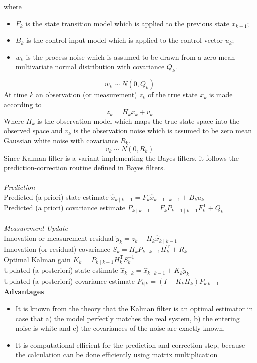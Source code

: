 where
\begin{itemize}
  \item $F_k$ is the state transition model which is applied to the previous state $x_{k-1}$;  
  \item $B_k$ is the control-input model which is applied to the control vector $u_k$;
  \item $w_k$ is the process noise which is assumed to be drawn from a zero mean multivariate normal distribution with covariance $Q_k$.
\end{itemize}
$$w_k \sim N(0,Q_k)$$
At time $k$ an observation (or measurement) $z_k$ of the true state $x_k$ is made according to
$$z_k = H_kx_k + v_k$$
Where $H_k$ is the observation model which maps the true state space into the observed space and $v_k$ is the observation noise which is assumed to be zero mean Gaussian white noise with covariance $R_k$.
$$v_k \sim N(0,R_k)$$
Since Kalman filter is a variant implementing the Bayes filters, it follows the prediction-correction routine defined in Bayes filters.
\\
\\
\noindent\textit{Prediction}\\
Predicted (a priori) state estimate $\hat{x}_{k\mid k-1} = F_{k}\hat{x}_{k-1\mid k-1} + B_{k} u_{k}$ \\
Predicted (a priori) covariance estimate $P_{k\mid k-1} =  F_{k} P_{k-1\mid k-1} F_{k}^{\text{T}} + Q_{k}$\\
\\
\noindent\textit{Measurement Update}\\
Innovation or measurement residual $\tilde{y}_k = z_k - H_k\hat{x}_{k\mid k-1}$ \\
Innovation (or residual) covariance $S_k = H_k P_{k\mid k-1} H_k^\text{T} + R_k$ \\
Optimal Kalman gain $K_k = P_{k\mid k-1}H_k^\text{T}S_k^{-1}$ \\
Updated (a posteriori) state estimate $\hat{x}_{k\mid k} = \hat{x}_{k\mid k-1} + K_k\tilde{y}_k$ \\
Updated (a posteriori) covariance estimate $P_{k|k} = (I - K_k H_k) P_{k|k-1}$ \\

\noindent\textbf{Advantages}
\begin{itemize}
  \item  It is known from the theory that the Kalman filter is an optimal estimator in case that a) the model perfectly matches the real system, b) the entering noise is white and c) the covariances of the noise are exactly known.
  \item  It is computational efficient for the prediction and correction step, because the calculation can be done efficiently using matrix multiplication
\end{itemize}

